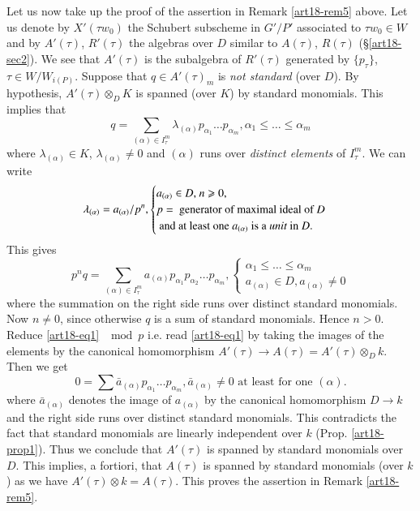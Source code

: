 Let us now take up the proof of the assertion in Remark \ref{art18-rem5} above. Let us denote by $X'(\tau w_0)$ the Schubert subscheme in $G'/P'$ associated to $\tau w_0\in W$ and by $A'(\tau)$, $R'(\tau)$ the algebras over $D$ similar to $A(\tau)$, $R(\tau)$ (\cf \S \ref{art18-sec2}). We see that $A'(\tau)$ is the subalgebra of $R'(\tau)$ generated by $\{p_\tau\}$, $\tau \in W / W_{i(P)}$. Suppose that $q \in A'(\tau)_m$ is {\em not standard} (over $D$). By hypothesis, $A'(\tau) \otimes_D K$ is spanned (over $K$) by standard monomials. This implies that 
$$
q = \sum\limits_{(\alpha) \in I^m_\tau} \lambda_{(\alpha)} p_{\alpha_1} \ldots p_{\alpha_m}, \alpha_1 \leqslant \ldots \leqslant \alpha_m
$$\pageoriginale
where $\lambda_{(\alpha)} \in K$, $\lambda_{(\alpha)} \neq 0$ and $(\alpha)$ runs over {\em distinct elements} of $I^m_\tau$. We can write
\begin{equation*}
\lambda_{(\alpha)} = a_{(\alpha)} /p^n, 
\begin{cases}
a_{(\alpha)} \in D$, $n \geqslant 0,\\
p = \text{ generator of maximal ideal of } D \\
\text{ and at least one $a_{(\alpha)}$ is a {\em unit}  in $D$.}
\end{cases}
\end{equation*}
This gives
\begin{equation*}
p^n q = \sum\limits_{(\alpha) \in I^m_\tau} a_{(\alpha)} p_{\alpha_1} p_{\alpha_2} \ldots p_{\alpha_m},
\begin{cases}
\alpha_1 \leqslant \ldots \leqslant \alpha_m\\
a_{(\alpha)} \in D, a_{(\alpha)} \neq 0
\end{cases}
\tag*{(1)}\label{art18-addeq1}
\end{equation*}
where the summation on the right side runs over distinct standard monomials. Now $n \neq 0$, since otherwise $q$ is a sum of standard monomials. Hence $n>0$. Reduce \ref{art18-eq1} $\mod p$ i.e. read \ref{art18-eq1} by taking the images of the elements by the canonical homomorphism $A'(\tau) \to A(\tau) = A'(\tau) \otimes_D k$. Then we get
\begin{equation*}
0 = \sum \bar{a}_{(\alpha)} p_{\alpha_1} \ldots p_{\alpha_m}, \bar{a}_{(\alpha)} \neq 0 \text{ at least for one }(\alpha). \tag*{(2)}\label{art18-addeq2}
\end{equation*}
where $\bar{a}_{(\alpha)}$ denotes the image of $a_{(\alpha)}$ by the canonical homomorphism $D \to k$ and the right side runs over distinct standard monomials. This contradicts the fact that standard monomials are linearly independent over $k$ (\cf Prop. \ref{art18-prop1}). Thus we conclude that $A'(\tau)$ is spanned by standard monomials over $D$. This implies, a fortiori, that $A(\tau)$ is spanned by standard monomials (over $k$) as we have $A'(\tau)\otimes k = A(\tau)$. This proves the assertion in Remark \ref{art18-rem5}.


